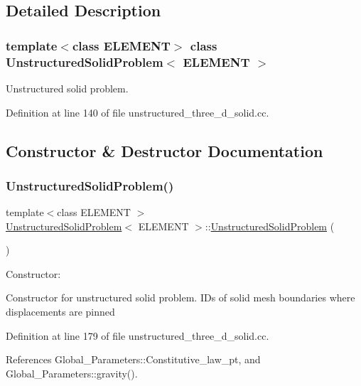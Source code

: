 \subsection{Detailed Description}
\subsubsection*{template$<$class E\+L\+E\+M\+E\+NT$>$\newline
class Unstructured\+Solid\+Problem$<$ E\+L\+E\+M\+E\+N\+T $>$}

Unstructured solid problem. 

Definition at line 140 of file unstructured\+\_\+three\+\_\+d\+\_\+solid.\+cc.



\subsection{Constructor \& Destructor Documentation}
\mbox{\label{classUnstructuredSolidProblem_a18ce02b6e4bbc86403c9e1b32c095772}} 
\subsubsection{\texorpdfstring{Unstructured\+Solid\+Problem()}{UnstructuredSolidProblem()}}
{\footnotesize\ttfamily template$<$class E\+L\+E\+M\+E\+NT $>$ \\
\hyperlink{classUnstructuredSolidProblem}{Unstructured\+Solid\+Problem}$<$ E\+L\+E\+M\+E\+NT $>$\+::\hyperlink{classUnstructuredSolidProblem}{Unstructured\+Solid\+Problem} (\begin{DoxyParamCaption}{ }\end{DoxyParamCaption})}



Constructor\+: 

Constructor for unstructured solid problem. I\+Ds of solid mesh boundaries where displacements are pinned 

Definition at line 179 of file unstructured\+\_\+three\+\_\+d\+\_\+solid.\+cc.



References Global\+\_\+\+Parameters\+::\+Constitutive\+\_\+law\+\_\+pt, and Global\+\_\+\+Parameters\+::gravity().

